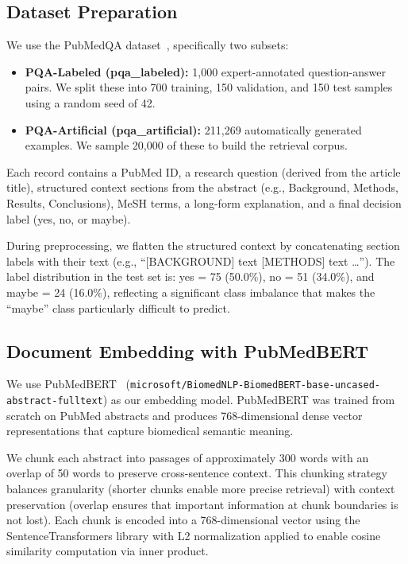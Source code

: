 \documentclass[conference]{IEEEtran}
\begin{document}
\subsection{Dataset Preparation}

We use the PubMedQA dataset~\cite{jin2019pubmedqa}, specifically two subsets:

\begin{itemize}[leftmargin=*]
    \item \textbf{PQA-Labeled (pqa\_labeled):} 1,000 expert-annotated question-answer pairs. We split these into 700 training, 150 validation, and 150 test samples using a random seed of 42.
    \item \textbf{PQA-Artificial (pqa\_artificial):} 211,269 automatically generated examples. We sample 20,000 of these to build the retrieval corpus.
\end{itemize}

Each record contains a PubMed ID, a research question (derived from the article title), structured context sections from the abstract (e.g., Background, Methods, Results, Conclusions), MeSH terms, a long-form explanation, and a final decision label (yes, no, or maybe).

During preprocessing, we flatten the structured context by concatenating section labels with their text (e.g., ``[BACKGROUND] text [METHODS] text \ldots''). The label distribution in the test set is: yes = 75 (50.0\%), no = 51 (34.0\%), and maybe = 24 (16.0\%), reflecting a significant class imbalance that makes the ``maybe'' class particularly difficult to predict.

\subsection{Document Embedding with PubMedBERT}

We use PubMedBERT~\cite{gu2021domain} (\texttt{microsoft/BiomedNLP-BiomedBERT-base-uncased-abstract-fulltext}) as our embedding model. PubMedBERT was trained from scratch on PubMed abstracts and produces 768-dimensional dense vector representations that capture biomedical semantic meaning.

We chunk each abstract into passages of approximately 300 words with an overlap of 50 words to preserve cross-sentence context. This chunking strategy balances granularity (shorter chunks enable more precise retrieval) with context preservation (overlap ensures that important information at chunk boundaries is not lost). Each chunk is encoded into a 768-dimensional vector using the SentenceTransformers library with L2 normalization applied to enable cosine similarity computation via inner product.
\end{document}
